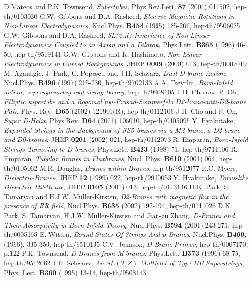 \documentclass[a4paper,12pt]{article}
\begin{document}
\begin{thebibliography}{99}

D.Mateos and P.K. Townsend, {\it Subertubes}, Phys.Rev.Lett. 
{\bf 87} (2001) 011602, hep-th/0103030
G.W. Gibbons and D.A. Rasheed, {\it Electric-Magnetic Rotations 
in Non-Linear Electrodynamics}, Nucl.Phys. {\bf B454} 
(1995) 185-206, hep-th/9506035
G.W. Gibbons and D.A. Rasheed, {\it SL(2,R) Invariance of 
Non-Linear Electrodynamics Coupled to an Axion and a Dilaton}, Phys.Lett. 
{\bf B365} (1996) 46-50, hep-th/9509141 
G.W. Gibbons and K. Hashimoto, {\it Non-Linear Electrodynamics in Curved Backgrounds}, JHEP {\bf 0009} (2000) 013, hep-th/0007019
M. Aganagic, J. Park, C. Popescu and J.H. Schwarz, {\it Dual 
D-brane Action}, Nucl.Phys. {\bf B496} (1997) 215-230, hep-th/9702133
A.A. Tseytlin, {\it Born-Infeld action, supersymmetry and string 
theory}, hep-th/9908105
J-H. Cho and P. Oh, {\it Elliptic supertube and a Bogomol'nyi-Prasad-Sommerfeld D2-brane-anti-D2-brane Pair}, Phys. Rev. {\bf D65} (2002) 121901(R), hep-th/0112106
J-H. Cho and P. Oh, {\it Super D-Helix}, Phys.Rev. {\bf D64} 
(2001) 106010, hep-th/0105095
Y. Hyakutake, {\it Expanded Strings in the Background of 
NS5-branes via a M2-brane, a D2-brane and D0-branes}, JHEP {\bf 0201} (2002) 
021, hep-th/0112073
R. Emparan, {\it Born-Infeld Strings Tunneling to D-branes}, 
Phys.Lett. {\bf B423} (1998) 71, hep-th/9711106
R. Emparan, {\it Tubular Branes in Fluxbranes}, Nucl. Phys. {\bf B610} (2001) 064, hep-th/0105062 
M.R. Douglas, {\it Branes within Branes}, hep-th/9512077
R.C. Myers, {\it Dielectric-Branes}, JHEP {\bf 12} (1999) 022, 
hep-th/9910053
Y. Hyakutake, {\it Torus-like Dielectric D2-Brane}, JHEP {\bf 0105} (2001) 013, hep-th/0103146
D.K. Park, S. Tamaryan and H.J.W. M\"uller-Kirsten, {\it D2-Branes 
with magnetic flux in the presence of RR field}, Nucl.Phys. {\bf B635} (2002) 
192-194, hep-th/0111026
D.K. Park, S. Tamaryan, H.J.W. M\"uller-Kirsten and Jian-zu Zhang, 
{\it D-Branes and Their Absorptivity in Born-Infeld Theory}, Nucl.Phys. 
{\bf B594} (2001) 243-271, hep-th/0005165
E. Witten, {\it Bound States Of Strings And $p$-Branes}, 
Nucl.Phys. {\bf B460}, (1996), 335-350, hep-th/9510135
C.V. Johnson, {\it D-Brane Primer}, hep-th/0007170, p.122
P.K. Townsend, {\it D-Branes from M-branes}, Phys.Lett. {\bf B373} 
(1996) 68-75, hep-th/9512062
J.H. Schwarz, {\it An $SL(2,Z)$ Multiplet of Type IIB Superstrings}, Phys. Lett. {\bf B360} (1995) 13-14, hep-th/9508143
\end{thebibliography}
\end{document}
